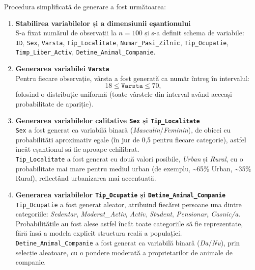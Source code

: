 \documentclass[12pt,a4paper]{report}
\begin{document}
Procedura simplificată de generare a fost următoarea:

\begin{enumerate}[leftmargin=1.2cm,label=\arabic*.]
  \item \textbf{Stabilirea variabilelor și a dimensiunii eșantionului}\\
  S-a fixat numărul de observații la $n = 100$ și s-a definit schema de variabile: \texttt{ID}, \texttt{Sex}, \texttt{Varsta}, \texttt{Tip\_Localitate}, \texttt{Numar\_Pasi\_Zilnic}, \texttt{Tip\_Ocupatie}, \texttt{Timp\_Liber\_Activ}, \texttt{Detine\_Animal\_Companie}.

  \item \textbf{Generarea variabilei \texttt{Varsta}}\\
  Pentru fiecare observație, vârsta a fost generată ca număr întreg în intervalul:
  \[
  18 \leq \texttt{Varsta} \leq 70,
  \]
  folosind o distribuție uniformă (toate vârstele din interval având aceeași probabilitate de apariție).

  \item \textbf{Generarea variabilelor calitative \texttt{Sex} și \texttt{Tip\_Localitate}}\\
  \texttt{Sex} a fost generat ca variabilă binară (\textit{Masculin}/\textit{Feminin}), de obicei cu probabilități aproximativ egale (în jur de 0{,}5 pentru fiecare categorie), astfel încât eșantionul să fie aproape echilibrat.\\[0.2cm]
  \texttt{Tip\_Localitate} a fost generat cu două valori posibile, \textit{Urban} și \textit{Rural}, cu o probabilitate mai mare pentru mediul urban (de exemplu, \textasciitilde 65\% Urban, \textasciitilde 35\% Rural), reflectând urbanizarea mai accentuată.

  \item \textbf{Generarea variabilelor \texttt{Tip\_Ocupatie} și \texttt{Detine\_Animal\_Companie}}\\
  \texttt{Tip\_Ocupatie} a fost generat aleator, atribuind fiecărei persoane una dintre categoriile:
  \textit{Sedentar}, \textit{Moderat\_Activ}, \textit{Activ}, \textit{Student}, \textit{Pensionar}, \textit{Casnic/a}. Probabilitățile au fost alese astfel încât toate categoriile să fie reprezentate, fără însă a modela explicit structura reală a populației.\\[0.2cm]
  \texttt{Detine\_Animal\_Companie} a fost generat ca variabilă binară (\textit{Da}/\textit{Nu}), prin selecție aleatoare, cu o pondere moderată a proprietarilor de animale de companie.


\end{enumerate}
\end{document}
